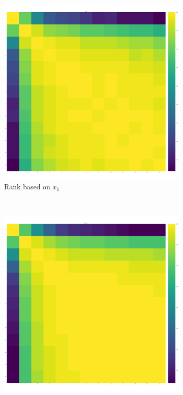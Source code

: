 \documentclass{article}
\begin{document}
\begin{figure}[!htbp]
    \centering
    \begin{subfigure}[t]{.3\textwidth}
        \centering
        \includegraphics[width=.9\textwidth]{./img/correlation_heatmap_invade.pdf}
        \caption{Rank based on \(x_1\)}
    \end{subfigure}
    ~
    \begin{subfigure}[t]{.3\textwidth}
        \centering
        \includegraphics[width=.9\textwidth]{./img/correlation_heatmap_resist.pdf}

\end{subfigure}
\end{figure}
\end{document}
